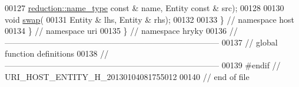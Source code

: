 \begin{DoxyCode}
00127         \hyperlink{namespacehryky_1_1reduction_ac686c30a4c8d196bbd0f05629a6b921f}{reduction::name_type} \textcolor{keyword}{const} & name, Entity \textcolor{keyword}{const} & src);
00128 
00130     \textcolor{keywordtype}{void} \hyperlink{namespacehryky_1_1uri_a385681623309ce37d502b7efea1bf924}{swap}(
00131         Entity & lhs, Entity & rhs);
00132 
00133 \} \textcolor{comment}{// namespace host}
00134 \} \textcolor{comment}{// namespace uri}
00135 \} \textcolor{comment}{// namespace hryky}
00136 \textcolor{comment}{//
      ------------------------------------------------------------------------------}
00137 \textcolor{comment}{// global function definitions}
00138 \textcolor{comment}{//
      ------------------------------------------------------------------------------}
00139 \textcolor{preprocessor}{#endif // URI\_HOST\_ENTITY\_H\_20130104081755012}
00140 \textcolor{preprocessor}{}\textcolor{comment}{// end of file}
\end{DoxyCode}
